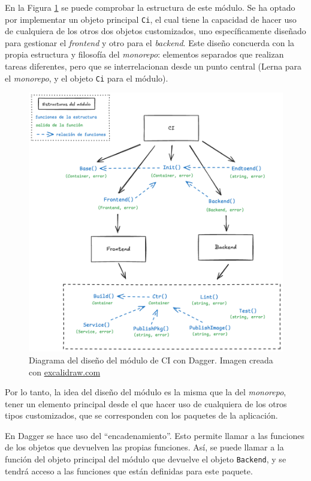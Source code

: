 En la Figura \ref{fig:dagger-ci} se puede comprobar la estructura de este módulo. Se ha optado por implementar un objeto principal \texttt{Ci}, el cual tiene la capacidad de hacer uso de cualquiera de los otros dos objetos customizados, uno específicamente diseñado para gestionar el \textit{frontend} y otro para el \textit{backend}. Este diseño concuerda con la propia estructura y filosofía del \textit{monorepo}: elementos separados que realizan tareas diferentes, pero que se interrelacionan desde un punto central (Lerna para el \textit{monorepo}, y el objeto \texttt{Ci} para el módulo).

\begin{figure}[h]
  \centerline{\includegraphics[width=12cm]{figuras/dagger-CI}}
  \caption{Diagrama del diseño del módulo de CI con Dagger. Imagen creada con \href{https://excalidraw.com}{excalidraw.com}}
  \label{fig:dagger-ci}
\end{figure}

Por lo tanto, la idea del diseño del módulo es la misma que la del \textit{monorepo}, tener un elemento principal desde el que hacer uso de cualquiera de los otros tipos customizados\cite{dagger-custom-types}, que se corresponden con los paquetes de la aplicación.

En Dagger se hace uso del ``encadenamiento''. Esto permite llamar a las funciones de los objetos que devuelven las propias funciones. Así, se puede llamar a la función del objeto principal del módulo que devuelve el objeto \texttt{Backend}, y se tendrá acceso a las funciones que están definidas para este paquete.

